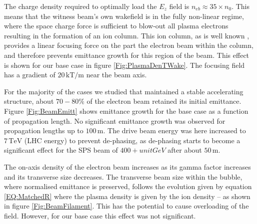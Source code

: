 \documentclass[aps,prstab,reprint,amsmath,amssymb,groupedaddress]{revtex4-1}
\newcommand{\unit}[1]{\,\mathrm{#1}}
\begin{document}
The charge density required to optimally load the $E_{z}$ field is $n_{eb} \approx 35\times n_{0}$. This means that the
witness beam's own wakefield is in the fully non-linear regime, where the space charge force is sufficient to blow-out
all plasma electrons resulting in the formation of an ion column. This ion column, as is well known
\cite{rosenzweig:1991}, provides a linear focusing force on the part the electron beam within the column, and therefore
prevents emittance growth for this region of the beam. This effect is shown for our base case in figure
\ref{Fig:PlasmaDenTWake}. The focusing field has a gradient of $20\unit{kT/m}$ near the beam axis.



For the majority of the cases we studied that maintained a stable accelerating structure, about $70-80\%$ of the
electron beam retained its initial emittance. Figure \ref{Fig:BeamEmitt} shows emittance growth for the base case as a
function of propagation length. No significant emittance growth was observed for propagation lengths up to
$100\unit{m}$. The drive beam energy was here increased to $7\unit{TeV}$ (LHC energy) to prevent de-phasing, as
de-phasing starts to become a significant effect for the SPS beam of $400+unit{GeV}$ after about $50\unit{m}$.

The on-axis density of the electron beam increases as its gamma factor increases and its transverse size decreases. The
transverse beam size within the bubble, where normalised emittance is preserved, follows the evolution given by equation
\ref{EQ:MatchedR} where the plasma density is given by the ion density -- as shown in figure \ref{Fig:BeamFilament}.
This has the potential to cause overloading of the field. However, for our base case this effect was not significant.
\end{document}
